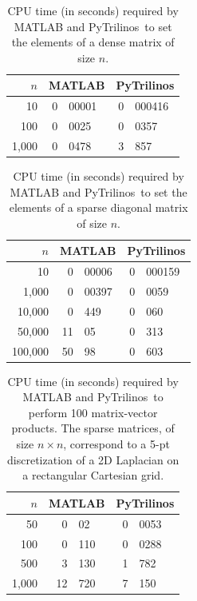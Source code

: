 \documentclass[acmtocl]{acmtrans2m}
\newcommand{\PyTrilinos}{{PyTrilinos}}
\begin{document}
\begin{table}
  \begin{center}
    \begin{tabular}{|r|r@{.}l|r@{.}l|}
      \hline
      $n$ & \multicolumn{2}{c|}{MATLAB} &
      \multicolumn{2}{c|}{PyTrilinos} \\
      \hline
      \hline
         10  & 0&00001 & 0&000416 \\
        100  & 0&0025  & 0&0357   \\
      1,000  & 0&0478  & 3&857    \\
      \hline
    \end{tabular}
    \caption{CPU time (in seconds) required by MATLAB and
      \PyTrilinos\ to set the elements of a dense matrix of size $n$.}
    \label{tab:matlab_dense}
  \end{center}
\end{table}

\begin{table}
  \begin{center}
    \begin{tabular}{|r|r@{.}l|r@{.}l|}
      \hline
      $n$ & \multicolumn{2}{c|}{MATLAB} &
      \multicolumn{2}{c|}{PyTrilinos} \\
      \hline
      \hline
           10 &  0&00006 & 0&000159 \\
        1,000 &  0&00397 & 0&0059   \\
       10,000 &  0&449   & 0&060    \\
       50,000 & 11&05    & 0&313    \\
      100,000 & 50&98    & 0&603    \\
      \hline
    \end{tabular}
    \caption{CPU time (in seconds) required by MATLAB and
      \PyTrilinos\ to set the elements of a sparse diagonal matrix of
      size $n$.}
    \label{tab:matlab_sparse}
  \end{center}
\end{table}

\begin{table}
  \begin{center}
    \begin{tabular}{|r|r@{.}l|r@{.}l|}
      \hline
      $n$ & \multicolumn{2}{c|}{MATLAB} &
      \multicolumn{2}{c|}{PyTrilinos} \\
      \hline
      \hline
         50 &  0&02  & 0&0053 \\
        100 &  0&110 & 0&0288 \\
        500 &  3&130 & 1&782  \\
      1,000 & 12&720 & 7&150  \\
      \hline
    \end{tabular}
    \caption{CPU time (in seconds) required by MATLAB and
      \PyTrilinos\ to perform 100 matrix-vector products.  The sparse
      matrices, of size $n \times n$, correspond to a 5-pt
      discretization of a 2D Laplacian on a rectangular Cartesian
      grid.}
    \label{tab:matlab_matvec}
  \end{center}
\end{table}
\end{document}
